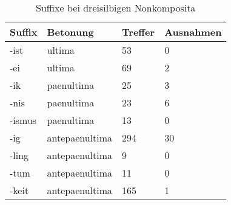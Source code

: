\begin{table}[]
\centering
\caption{Suffixe bei dreisilbigen Nonkomposita}
\begin{tabular}{|l|l|l|l|}
\hline
{\bf Suffix} & {\bf Betonung} & {\bf Treffer} & {\bf Ausnahmen} \\ \hline
-ist         & ultima         & 53            & 0               \\ \hline
-ei          & ultima         & 69            & 2               \\ \hline
-ik          & paenultima     & 25            & 3               \\ \hline
-nis         & paenultima     & 23            & 6               \\ \hline
-ismus       & paenultima     & 13            & 0               \\ \hline
-ig          & antepaenultima & 294           & 30              \\ \hline
-ling        & antepaenultima & 9             & 0               \\ \hline
-tum         & antepaenultima & 11            & 0               \\ \hline
-keit        & antepaenultima & 165           & 1               \\ \hline
\end{tabular}
\end{table}